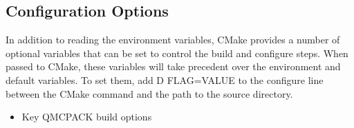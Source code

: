 \documentclass[letterpaper,10pt,english]{sphinxmanual}
\begin{document}
\subsection{Configuration Options}
\label{\detokenize{installation:configuration-options}}\label{\detokenize{installation:cmakeoptions}}
In addition to reading the environment variables, CMake provides a
number of optional variables that can be set to control the build and
configure steps.  When passed to CMake, these variables will take
precedent over the environment and default variables.  To set them,
add \sphinxhyphen{}D FLAG=VALUE to the configure line between the CMake command and
the path to the source directory.
\begin{itemize}
\item {} 
Key QMCPACK build options

\begin{sphinxVerbatim}[commandchars=\\\{\}]
                    
                  
         
                           
                          
                              
                           
                               
                                

\end{sphinxVerbatim}
\end{itemize}
\end{document}

